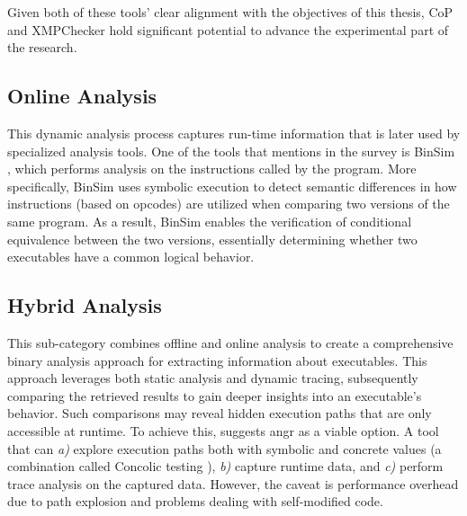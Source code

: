 Given both of these tools' clear alignment with the objectives of this thesis, CoP and XMPChecker hold significant potential to advance the experimental part of the research.


\subsection{Online Analysis}
This dynamic analysis process captures run-time information that is later used by specialized analysis tools. One of the tools that \textcite{automating_binary_analysis} mentions in the survey is BinSim \cite{binsim}, which performs analysis on the instructions called by the program. More specifically, BinSim uses symbolic execution to detect semantic differences in how instructions (based on opcodes) are utilized when comparing two versions of the same program. As a result, BinSim enables the verification of conditional equivalence between the two versions, essentially determining whether two executables have a common logical behavior.


\subsection{Hybrid Analysis}
This sub-category combines offline and online analysis to create a comprehensive binary analysis approach for extracting information about executables. This approach leverages both static analysis and dynamic tracing, subsequently comparing the retrieved results to gain deeper insights into an executable's behavior. Such comparisons may reveal hidden execution paths that are only accessible at runtime. To achieve this, \textcite{automating_binary_analysis} suggests angr \cite{angr_original} as a viable option. A tool that can \textit{a)} explore execution paths both with symbolic and concrete values (a combination called Concolic testing \cite{concolic_testing}), \textit{b)} capture runtime data, and \textit{c)} perform trace analysis on the captured data. However, the caveat is performance overhead due to path explosion and problems dealing with self-modified code.



